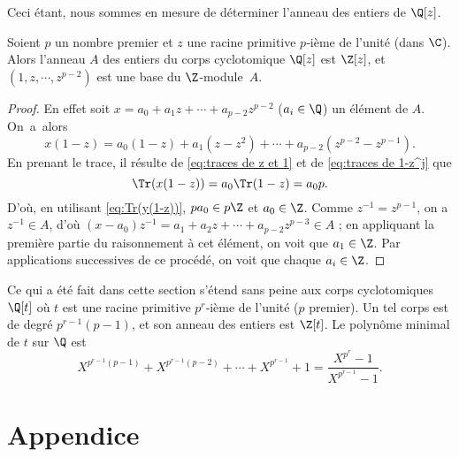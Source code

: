 \documentclass[11pt, useosf,
  title in boldface,
  theorem in new line,
  theorem numbering = section,
  number theorems separately,
]{simplivre}
\begin{document}
    Ceci étant, nous sommes en mesure de déterminer l'anneau des entiers de \( \Q[z] \).

\enlargethispage*{\baselineskip}
    \begin{theorem}\label{thm:base d'un corps cyclotomique}
        Soient \( p \) un nombre premier et \( z \) une racine primitive \( p \)‑ième de l'unité (dans \( \C \)). Alors l'anneau \( A \) des entiers du corps cyclotomique \( \Q[z] \) est \( \Z[z] \), et \( (1,z,\cdots,z^{p-2}) \) est une base du \( \Z \)‑module~\( A \).
    \end{theorem}
    \begin{proof}
        En effet soit \( x = a_0 + a_1 z + \cdots + a_{p-2}z^{p-2} \) (\( a_i \in \Q \)) un élément de \( A \). On~a~alors
        \[
            x(1-z) = a_0(1-z) + a_1(z-z^2) + \cdots + a_{p-2}(z^{p-2}-z^{p-1}).
        \]
        En prenant le trace, il résulte de \eqref{eq:traces de z et 1} et de \eqref{eq:traces de 1-z^j} que
        \[
            \Tr(x(1-z)) = a_0 \Tr(1-z) = a_0 p.
        \]
        D'où, en utilisant \eqref{eq:Tr(y(1-z))}, \( p a_0 \in p\Z \) et \( a_0 \in \Z \). Comme \( z^{-1} = z^{p-1} \), on a \( z^{-1} \in A \), d'où \( (x-a_0)z^{-1} = a_1 + a_2 z + \cdots + a_{p-2}z^{p-3} \in A \) ; en appliquant la première partie du raisonnement à cet élément, on voit que \( a_1 \in \Z \). Par applications successives de ce procédé, on voit que chaque \( a_i \in \Z \).
    \end{proof}

    \begin{remark}
        Ce qui a été fait dans cette section s'étend sans peine aux corps cyclotomiques \( \Q[t] \) où \( t \) est une racine primitive \( p^r \)‑ième de l'unité (\( p \) premier). Un tel corps est de degré \( p^{r-1}(p-1) \), et son anneau des entiers est \( \Z[t] \). Le polynôme minimal de \( t \) sur \( \Q \) est
        \[
            X^{p^{r-1}(p-1)} + X^{p^{r-1}(p-2)} + \cdots + X^{p^{r-1}} + 1 = \frac{X^{p^r} - 1}{X^{p^{r-1}} - 1}.
        \]
    \end{remark}

\cleardoublepage
{}
{}
\section*{Appendice}
\end{document}
